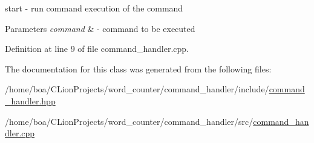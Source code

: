 start -\/ run command execution of the command 


\begin{DoxyParams}{Parameters}
{\em command} & -\/ command to be executed \\
\hline
\end{DoxyParams}


Definition at line 9 of file command\+\_\+handler.\+cpp.



The documentation for this class was generated from the following files\+:\begin{DoxyCompactItemize}
\item 
/home/boa/\+C\+Lion\+Projects/word\+\_\+counter/command\+\_\+handler/include/\hyperlink{command__handler_8hpp}{command\+\_\+handler.\+hpp}\item 
/home/boa/\+C\+Lion\+Projects/word\+\_\+counter/command\+\_\+handler/src/\hyperlink{command__handler_8cpp}{command\+\_\+handler.\+cpp}\end{DoxyCompactItemize}
